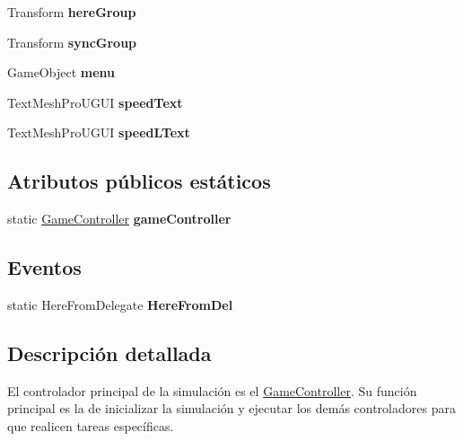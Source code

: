 \begin{DoxyCompactItemize}
\mbox{\label{class_game_controller_adc5d9c82337016042d0a4b7a431b8a0e}} 
Transform {\bfseries here\+Group}
\item 
\mbox{\label{class_game_controller_aef6447cf8e9a9e5945a45e0a0d4cbeea}} 
Transform {\bfseries sync\+Group}
\item 
\mbox{\label{class_game_controller_af4c293b5d621fe28f1e6b72f9efa293f}} 
Game\+Object {\bfseries menu}
\item 
\mbox{\label{class_game_controller_ae2a547ae9f7294b4c3d7064ff037b7d1}} 
Text\+Mesh\+Pro\+U\+G\+UI {\bfseries speed\+Text}
\item 
\mbox{\label{class_game_controller_a80a5ddb548350ff8522690213155ffc7}} 
Text\+Mesh\+Pro\+U\+G\+UI {\bfseries speed\+L\+Text}
\end{DoxyCompactItemize}
\subsection*{Atributos públicos estáticos}
\begin{DoxyCompactItemize}
\item 
\mbox{\label{class_game_controller_a46ccbbf4e13ee78f28da6b0ed2595cf3}} 
static \mbox{\hyperlink{class_game_controller}{Game\+Controller}} {\bfseries game\+Controller}
\end{DoxyCompactItemize}
\subsection*{Eventos}
\begin{DoxyCompactItemize}
\item 
\mbox{\label{class_game_controller_acb69ab50fb463c78d7d47e94edf85a9e}} 
static Here\+From\+Delegate {\bfseries Here\+From\+Del}
\end{DoxyCompactItemize}


\subsection{Descripción detallada}
El controlador principal de la simulación es el \mbox{\hyperlink{class_game_controller}{Game\+Controller}}. Su función principal es la de inicializar la simulación y ejecutar los demás controladores para que realicen tareas específicas.

